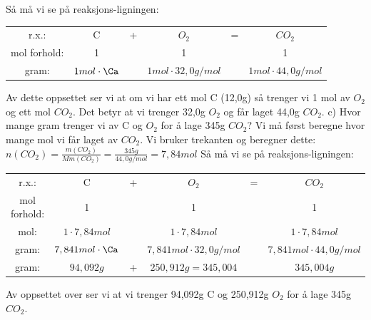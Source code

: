 \documentclass[12pt,a4paper]{article}
\begin{document}
Så må vi se på reaksjons-ligningen:\nl
\begin{table}[H]
    \centering
    \begin{tabular}{cccccc}
         r.x.:& C&+ &$O_2$&= & $CO_2$\\
         mol forhold:&1 &  & 1 &  &1 \\
         gram:&$1mol\cdot\Ca$ &  &$1mol\cdot 32,0g/mol$  &  &$1mol\cdot 44,0g/mol$ \\
    \end{tabular}
\end{table}\nl
Av dette oppsettet ser vi at om vi har ett mol C (12,0g) så trenger vi 1 mol av $O_2$ og ett mol $CO_2$. Det betyr at vi trenger 32,0g $O_2$ og får laget 44,0g $CO_2$. 
\newpage
c) Hvor mange gram trenger vi av C og $O_2$ for å lage 345g $CO_2$?\nl
Vi må først beregne hvor mange mol vi får laget av $CO_2$.  Vi bruker trekanten og beregner dette:\nl
$n(CO_2)=\frac{m(CO_2)}{Mm(CO_2)}=\frac{345g}{44,0g/mol}=7,84mol$\nl
Så må vi se på reaksjons-ligningen:\nl
\begin{table}[H]
    \centering
    \begin{tabular}{cccccc}
         r.x.:& C&+ &$O_2$&= & $CO_2$\\
         mol forhold:&1 &  & 1 &  &1 \\
         mol:&$1\cdot 7,84mol$ &  &$1\cdot 7,84mol$  &  &$1\cdot 7,84mol$ \\
         gram:&$7,841mol\cdot\Ca$ &  &$7,841mol\cdot 32,0g/mol$  &  &$7,841mol\cdot 44,0g/mol$ \\
         gram:&$94,092g$ & + &$250,912g=345,004$  &  &$345,004g$ \\
    \end{tabular}
\end{table}\nl
Av oppsettet over ser vi at vi trenger 94,092g C og 250,912g $O_2$ for å lage 345g $CO_2$.
\nl[2]
\end{document}

